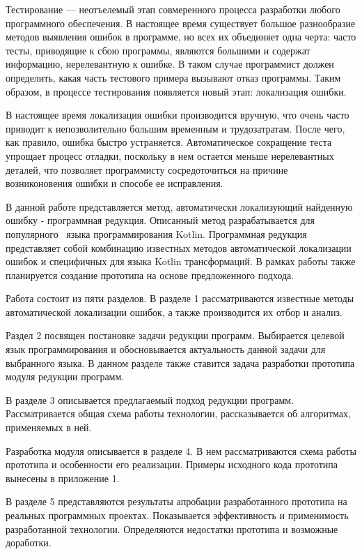 \intro
Тестирование --- неотъелемый этап совмеренного процесса разработки любого программного обеспечения. В настоящее время существует большое разнообразие методов выявления ошибок в программе, но всех их объединяет одна черта: часто тесты, приводящие к сбою программы, являются большими и содержат информацию, нерелевантную к ошибке. В таком случае программист должен определить, какая часть тестового примера вызывают отказ программы. Таким образом, в процессе тестирования появляется новый этап: локализация ошибки. 

В настоящее время локализация ошибки производится вручную, что очень часто приводит к непозволительно большим временным и трудозатратам. После чего, как правило, ошибка быстро устраняется. Автоматическое сокращение теста упрощает процесс отладки, поскольку в нем остается меньше нерелевантных деталей, что позволяет программисту сосредоточиться на причине возниконовения ошибки и способе ее исправления.

В данной работе представляется метод, автоматически локализующий найденную ошибку - программная редукция. Описанный метод разрабатывается для популярного~\cite{tiobe2018tiobe} языка программирования Kotlin. Программная редукция представляет собой комбинацию известных методов автоматической локализации ошибок и специфичных для языка Kotlin трансформаций. В рамках работы также планируется создание прототипа на основе предложенного подхода.

Работа состоит из пяти разделов. В разделе 1 рассматриваются известные методы автоматической локализации ошибок, а также производится их отбор и анализ. 

Раздел 2 посвящен постановке задачи редукции программ. Выбирается целевой язык программирования и обосновывается актуальность данной задачи для выбранного языка. В данном разделе также ставится задача разработки прототипа модуля редукции программ.

В разделе 3 описывается предлагаемый подход редукции программ. Рассматривается общая схема работы технологии, рассказывается об алгоритмах, применяемых в ней.


Разработка модуля описывается в разделе 4. В нем рассматри­ваются схема работы прототипа и особенности его реализации. Примеры исходного кода прототипа вынесены
в приложение 1.

В разделе 5 представляются результаты апробации разработан­ного прототипа на реальных программных проектах. Показывается эффективность и применимость разработанной технологии. Определяются недостатки прототипа и возможные доработки. 